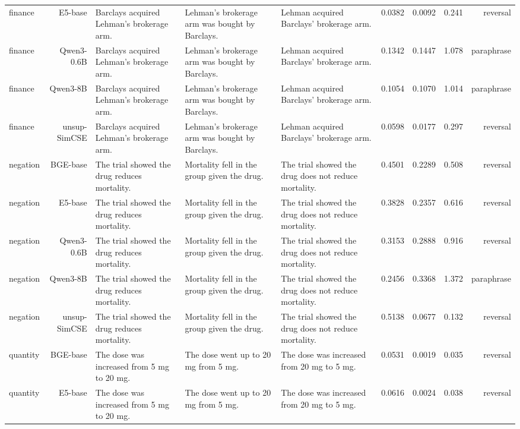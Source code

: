 \documentclass[10pt]{article}
\begin{document}
\begin{longtable}{lr>{\raggedright\arraybackslash}p{4.6cm}>{\raggedright\arraybackslash}p{4.6cm}>{\raggedright\arraybackslash}p{4.6cm}rrrr}
finance & E5-base & Barclays acquired Lehman's brokerage arm. & Lehman's brokerage arm was bought by Barclays. & Lehman acquired Barclays' brokerage arm. & 0.0382 & 0.0092 & 0.241 & reversal \\
finance & Qwen3-0.6B & Barclays acquired Lehman's brokerage arm. & Lehman's brokerage arm was bought by Barclays. & Lehman acquired Barclays' brokerage arm. & 0.1342 & 0.1447 & 1.078 & paraphrase \\
finance & Qwen3-8B & Barclays acquired Lehman's brokerage arm. & Lehman's brokerage arm was bought by Barclays. & Lehman acquired Barclays' brokerage arm. & 0.1054 & 0.1070 & 1.014 & paraphrase \\
finance & unsup-SimCSE & Barclays acquired Lehman's brokerage arm. & Lehman's brokerage arm was bought by Barclays. & Lehman acquired Barclays' brokerage arm. & 0.0598 & 0.0177 & 0.297 & reversal \\
negation & BGE-base & The trial showed the drug reduces mortality. & Mortality fell in the group given the drug. & The trial showed the drug does not reduce mortality. & 0.4501 & 0.2289 & 0.508 & reversal \\
negation & E5-base & The trial showed the drug reduces mortality. & Mortality fell in the group given the drug. & The trial showed the drug does not reduce mortality. & 0.3828 & 0.2357 & 0.616 & reversal \\
negation & Qwen3-0.6B & The trial showed the drug reduces mortality. & Mortality fell in the group given the drug. & The trial showed the drug does not reduce mortality. & 0.3153 & 0.2888 & 0.916 & reversal \\
negation & Qwen3-8B & The trial showed the drug reduces mortality. & Mortality fell in the group given the drug. & The trial showed the drug does not reduce mortality. & 0.2456 & 0.3368 & 1.372 & paraphrase \\
negation & unsup-SimCSE & The trial showed the drug reduces mortality. & Mortality fell in the group given the drug. & The trial showed the drug does not reduce mortality. & 0.5138 & 0.0677 & 0.132 & reversal \\
quantity & BGE-base & The dose was increased from 5 mg to 20 mg. & The dose went up to 20 mg from 5 mg. & The dose was increased from 20 mg to 5 mg. & 0.0531 & 0.0019 & 0.035 & reversal \\
quantity & E5-base & The dose was increased from 5 mg to 20 mg. & The dose went up to 20 mg from 5 mg. & The dose was increased from 20 mg to 5 mg. & 0.0616 & 0.0024 & 0.038 & reversal \\

\end{longtable}
\end{document}
